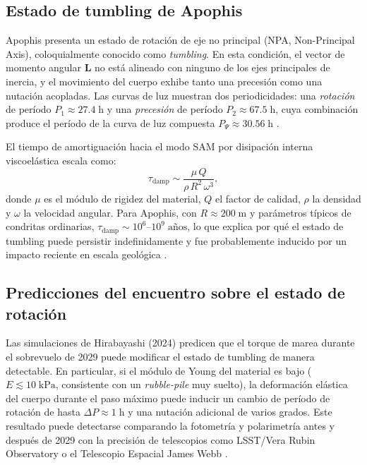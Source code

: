 \documentclass[a4paper]{article}
\begin{document}
\subsection{Estado de tumbling de Apophis}

Apophis presenta un estado de rotación de eje no principal (NPA, Non-Principal Axis), coloquialmente conocido como \textit{tumbling}. En esta condición, el vector de momento angular $\mathbf{L}$ no está alineado con ninguno de los ejes principales de inercia, y el movimiento del cuerpo exhibe tanto una precesión como una nutación acopladas. Las curvas de luz muestran dos periodicidades: una \textit{rotación} de período $P_1 \approx 27.4\;\text{h}$ y una \textit{precesión} de período $P_2 \approx 67.5\;\text{h}$, cuya combinación produce el período de la curva de luz compuesta $P_\Psi \approx 30.56\;\text{h}$ \cite{hirabayashi2024prediction, jpl2024sbdb}.

El tiempo de amortiguación hacia el modo SAM por disipación interna viscoelástica escala como:
\begin{equation}
  \tau_\text{damp} \sim \frac{\mu\,Q}{\rho\,R^2\,\omega^3},
\end{equation}
donde $\mu$ es el módulo de rigidez del material, $Q$ el factor de calidad, $\rho$ la densidad y $\omega$ la velocidad angular. Para Apophis, con $R \approx 200\;\text{m}$ y parámetros típicos de condritas ordinarias, $\tau_\text{damp} \sim 10^6$--$10^9\;\text{años}$, lo que explica por qué el estado de tumbling puede persistir indefinidamente y fue probablemente inducido por un impacto reciente en escala geológica \cite{hirabayashi2024prediction}.

\subsection{Predicciones del encuentro sobre el estado de rotación}

Las simulaciones de Hirabayashi (2024) predicen que el torque de marea durante el sobrevuelo de 2029 puede modificar el estado de tumbling de manera detectable. En particular, si el módulo de Young del material es bajo ($E \lesssim 10\;\text{kPa}$, consistente con un \textit{rubble-pile} muy suelto), la deformación elástica del cuerpo durante el paso máximo puede inducir un cambio de período de rotación de hasta $\Delta P \approx 1\;\text{h}$ y una nutación adicional de varios grados. Este resultado puede detectarse comparando la fotometría y polarimetría antes y después de 2029 con la precisión de telescopios como LSST/Vera Rubin Observatory o el Telescopio Espacial James Webb \cite{hirabayashi2024prediction, esa2024ramses}.
\end{document}
